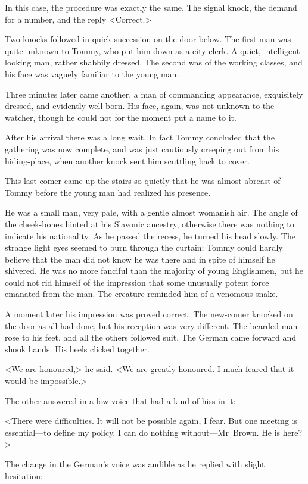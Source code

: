 In this case, the procedure was exactly the same. The signal knock, the demand for a number, and the reply <Correct.>

Two knocks followed in quick succession on the door below. The first man was quite unknown to Tommy, who put him down as a city clerk. A quiet, intelligent-looking man, rather shabbily dressed. The second was of the working classes, and his face was vaguely familiar to the young man.

Three minutes later came another, a man of commanding appearance, exquisitely dressed, and evidently well born. His face, again, was not unknown to the watcher, though he could not for the moment put a name to it.

After his arrival there was a long wait. In fact Tommy concluded that the gathering was now complete, and was just cautiously creeping out from his hiding-place, when another knock sent him scuttling back to cover.

This last-comer came up the stairs so quietly that he was almost abreast of Tommy before the young man had realized his presence.

He was a small man, very pale, with a gentle almost womanish air. The angle of the cheek-bones hinted at his Slavonic ancestry, otherwise there was nothing to indicate his nationality. As he passed the recess, he turned his head slowly. The strange light eyes seemed to burn through the curtain; Tommy could hardly believe that the man did not know he was there and in spite of himself he shivered. He was no more fanciful than the majority of young Englishmen, but he could not rid himself of the impression that some unusually potent force emanated from the man. The creature reminded him of a venomous snake.

A moment later his impression was proved correct. The new-comer knocked on the door as all had done, but his reception was very different. The bearded man rose to his feet, and all the others followed suit. The German came forward and shook hands. His heels clicked together.

<We are honoured,> he said. <We are greatly honoured. I much feared that it would be impossible.>

The other answered in a low voice that had a kind of hiss in it:

<There were difficulties. It will not be possible again, I fear. But one meeting is essential—to define my policy. I can do nothing without—Mr~Brown. He is here?>

The change in the German's voice was audible as he replied with slight hesitation:

